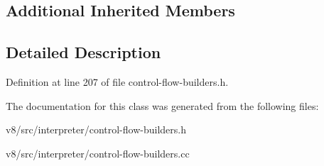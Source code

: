 \subsection*{Additional Inherited Members}


\subsection{Detailed Description}


Definition at line 207 of file control-\/flow-\/builders.\+h.



The documentation for this class was generated from the following files\+:\begin{DoxyCompactItemize}
\item 
v8/src/interpreter/control-\/flow-\/builders.\+h\item 
v8/src/interpreter/control-\/flow-\/builders.\+cc\end{DoxyCompactItemize}
